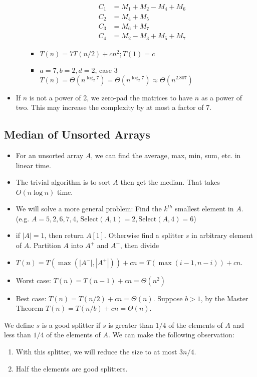 \documentclass[a4paper,12pt]{article}
\begin{document}
\begin{itemize}
\begin{enumerate}
        \begin{align}
            C_1 &= M_1+M_2-M_4+M_6\\
            C_2 &= M_4+M_5\\
            C_3 &= M_6+M_7\\
            C_4 &= M_2-M_3+M_5+M_7
        \end{align}
        \begin{itemize}
            \item $T(n)=7T(n/2)+cn^2; T(1)=c$
            \item $a=7,b=2,d=2$, case 3 $T(n)=\Theta(n^{\log_2 7})=\Theta(n^{\log_2 7})\approx\Theta(n^{2.807})$
        \end{itemize}
    \end{enumerate}
    \item If $n$ is not a power of 2, we zero-pad the matrices to have $n$ as a power of two. This may increase the complexity by at most a factor of 7.
\end{itemize}

\subsection{Median of Unsorted Arrays}
\begin{itemize}
    \item For an unsorted array $A$, we can find the average, max, min, sum, etc. in linear time.
    \item The trivial algorithm is to sort $A$ then get the median. That takes $O(n\log n)$ time.
    \item We will solve a more general problem: Find the $k^{th}$ smallest element in $A$. (e.g. $A=5,2,6,7,4$, $\mathrm{Select}(A,1)=2, \mathrm{Select}(A,4)=6$)
    \item if $|A|=1$, then return $A[1]$. Otherwise find a splitter $s$ in arbitrary element of $A$. Partition $A$ into $A^+$ and $A^-$, then divide 
    \item $T(n)=T(\max(|A^-|,|A^+|))+cn=T(\max(i-1,n-i))+cn$.
    \item Worst case: $T(n)=T(n-1)+cn=\Theta(n^2)$
    \item Best case: $T(n)=T(n/2)+cn=\Theta(n)$. Suppose $b>1$, by the Master Theorem $T(n)=T(n/b)+cn=\Theta(n)$.
\end{itemize}

We define $s$ is a good splitter if $s$ is greater than $1/4$ of the elements of $A$ and less than $1/4$ of the elements of $A$. We can make the following observation:
\begin{enumerate}
    \item With this splitter, we will reduce the size to at most $3n/4$.
    \item Half the elements are good splitters.
\end{enumerate}
\end{document}
